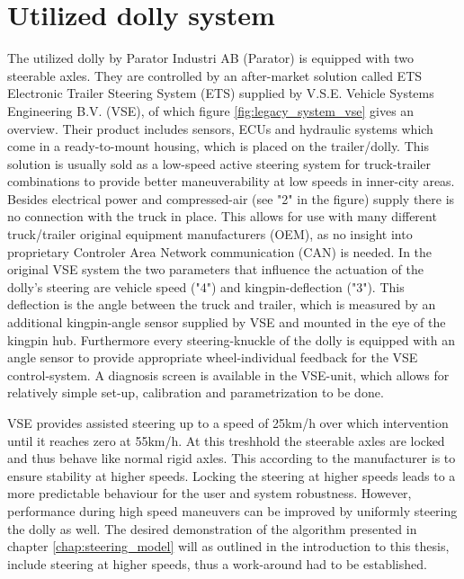 \documentclass[ExampleMasters.tex]{subfiles}
\begin{document}
\section{Utilized dolly system}
\label{sec:dolly_system}
The utilized dolly by Parator Industri AB (Parator) is equipped with two steerable axles. They are controlled by an after-market solution called ETS Electronic Trailer Steering System (ETS) supplied by V.S.E. Vehicle Systems Engineering B.V. (VSE), of which figure \ref{fig:legacy_system_vse} gives an overview. Their product includes sensors, ECUs and hydraulic systems which come in a ready-to-mount housing, which is placed on the trailer/dolly. This solution is usually sold as a low-speed active steering system for truck-trailer combinations to provide better maneuverability at low speeds in inner-city areas. Besides electrical power and compressed-air (see "2" in the figure) supply there is no connection with the truck in place. This allows for use with many different truck/trailer original equipment manufacturers (OEM), as no insight into proprietary Controler Area Network communication (CAN) is needed. In the original VSE system the two parameters that influence the actuation of the dolly's steering are vehicle speed ("4") and kingpin-deflection ("3"). This deflection is the angle between the truck and trailer, which is measured by an additional kingpin-angle sensor supplied by VSE and mounted in the eye of the kingpin hub. Furthermore every steering-knuckle of the dolly is equipped with an angle sensor to provide appropriate wheel-individual feedback for the VSE control-system. A diagnosis screen is available in the VSE-unit, which allows for relatively simple set-up, calibration and parametrization to be done.\cite{dolly_datasheet}

VSE provides assisted steering up to a speed of 25km/h over which intervention until it reaches zero at 55km/h. At this treshhold the steerable axles are locked and thus behave like normal rigid axles. This according to the manufacturer is to ensure stability at higher speeds.\cite{dolly_datasheet} Locking the steering at higher speeds leads to a more predictable behaviour for the user and system robustness. However, performance during high speed maneuvers can be improved by uniformly steering the dolly as well.\cite{performance_improvement} The desired demonstration of the algorithm presented in chapter \ref{chap:steering_model} will as outlined in the introduction to this thesis, include steering at higher speeds, thus a work-around had to be established.
\end{document}
